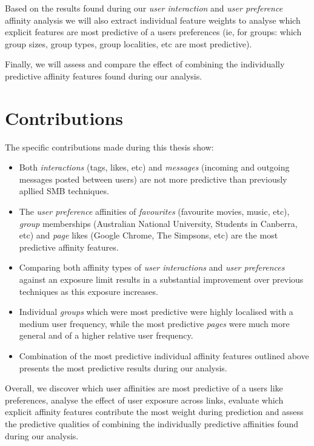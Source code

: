 Based on the results found during our \emph{user interaction} and \emph{user preference} affinity analysis we will also extract individual feature 
weights to analyse which explicit features are most predictive of a users preferences 
(ie, for groups: which group sizes, group types, group localities, etc are most predictive).

Finally, we will assess and compare the effect of combining the individually predictive affinity features found during our analysis.

\section{Contributions}
\label{sec:contributions}

The specific contributions made during this thesis show:

\begin{itemize}
\item Both \emph{interactions} (tags, likes, etc) and \emph{messages} (incoming and outgoing messages posted between users) are not more predictive than 
previously apllied SMB techniques.
\item The \emph{user preference} affinities of \emph{favourites} (favourite movies, music, etc), \emph{group} memberships (Australian National University, Students in Canberra, etc) 
and \emph{page} likes (Google Chrome, The Simpsons, etc) are the most predictive affinity features.
\item Comparing both affinity types of \emph{user interactions} and \emph{user preferences} against an exposure limit results in a 
substantial improvement over previous techniques as this exposure increases.
\item Individual \emph{groups} which were most predictive were highly localised with a medium user frequency, while the most predictive 
\emph{pages} were much more general and of a higher relative user frequency.
\item Combination of the most predictive individual affinity features outlined above presents the most predictive results during our analysis.
\end{itemize} 

Overall, we discover which user affinities are most predictive of a users like preferences, analyse the effect of user exposure across links, 
evaluate which explicit affinity features contribute the most weight during prediction and assess the predictive qualities of combining 
the individually predictive affinities found during our analysis.


